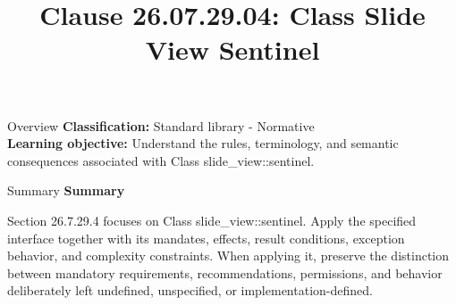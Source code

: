 \documentclass[10pt,letterpaper]{article}
\title{Clause 26.07.29.04: Class Slide View Sentinel}
\author{}
\date{}
\begin{document}
\maketitle
\begin{CornellOverviewBox}{Overview}
\textbf{Classification:} Standard library - Normative\\[2pt]
\textbf{Learning objective:} Understand the rules, terminology, and semantic consequences associated with Class slide\_view::sentinel.
\end{CornellOverviewBox}\begin{CornellSummaryBox}{Summary}
{\sffamily\bfseries\color{Accent} Summary}\par\vspace{3pt}Section 26.7.29.4 focuses on Class slide\_view::sentinel. Apply the specified interface together with its mandates, effects, result conditions, exception behavior, and complexity constraints. When applying it, preserve the distinction between mandatory requirements, recommendations, permissions, and behavior deliberately left undefined, unspecified, or implementation-defined.
\end{CornellSummaryBox}
\end{document}
